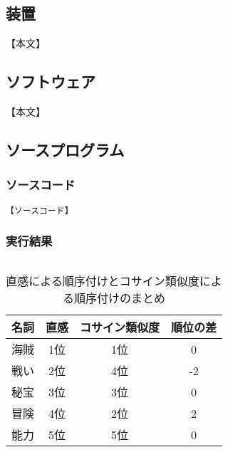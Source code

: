 \documentclass[a4paper, papersize]{jsarticle}
\begin{document}
\begin{multicols}{2}

\subsection{装置}
【本文】


\subsection{ソフトウェア}
【本文】


\subsection{ソースプログラム}


\subsubsection{ソースコード}

\setcounter{lstlisting}{4}
\renewcommand{\lstlistingname}{ソースコード}
\begin{lstlisting}[caption = 【ファイル名】, label=【参照名】]
【ソースコード】
\end{lstlisting}


\setcounter{lstlisting}{2}
\renewcommand{\lstlistingname}{実行結果}
\subsubsection{実行結果}
\setcounter{lstlisting}{0}
\renewcommand{\lstlistingname}{実行結果}
\begin{lstlisting}[caption = 【ファイル名】 \quad 【ファイル名】, label = 【参照名】]
\end{lstlisting}


\begin{table}[H]
 \centering
 \caption{直感による順序付けとコサイン類似度による順序付けのまとめ}
 \label{order_table}
  \begin{tabular}{l||ccc}
  	\hline
   名詞 & 直感 & コサイン類似度 & 順位の差 \\ \hline
   海賊 & 1位 & 1位 & 0 \\ \hline
   戦い & 2位 & 4位 & -2 \\ \hline
   秘宝 & 3位 & 3位 & 0 \\ \hline
   冒険 & 4位 & 2位 & 2 \\ \hline
   能力 & 5位 & 5位 & 0 \\ \hline
  \end{tabular}
\end{table}


\end{multicols}
\end{document}
